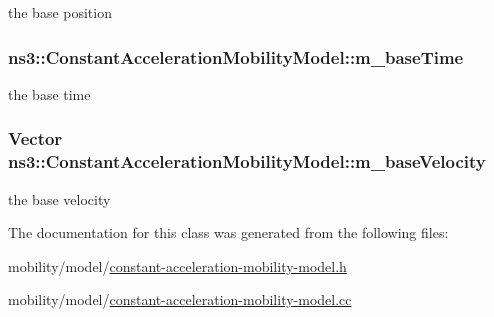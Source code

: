 the base position 

\subsubsection[{\texorpdfstring{m\+\_\+base\+Time}{m_baseTime}}]{ ns3\+::\+Constant\+Acceleration\+Mobility\+Model\+::m\+\_\+base\+Time\hspace{0.3cm}{\ttfamily [private]}}\hypertarget{classns3_1_1ConstantAccelerationMobilityModel_abae468b93d91aa5d58d1f8bd87bdd3ad}{}\label{classns3_1_1ConstantAccelerationMobilityModel_abae468b93d91aa5d58d1f8bd87bdd3ad}


the base time 

\subsubsection[{\texorpdfstring{m\+\_\+base\+Velocity}{m_baseVelocity}}]{\setlength{\rightskip}{0pt plus 5cm}Vector ns3\+::\+Constant\+Acceleration\+Mobility\+Model\+::m\+\_\+base\+Velocity\hspace{0.3cm}{\ttfamily [private]}}\hypertarget{classns3_1_1ConstantAccelerationMobilityModel_ad6271f0bacfbbf877887232c477d06f7}{}\label{classns3_1_1ConstantAccelerationMobilityModel_ad6271f0bacfbbf877887232c477d06f7}


the base velocity 



The documentation for this class was generated from the following files\+:\begin{DoxyCompactItemize}
\item 
mobility/model/\hyperlink{constant-acceleration-mobility-model_8h}{constant-\/acceleration-\/mobility-\/model.\+h}\item 
mobility/model/\hyperlink{constant-acceleration-mobility-model_8cc}{constant-\/acceleration-\/mobility-\/model.\+cc}\end{DoxyCompactItemize}
